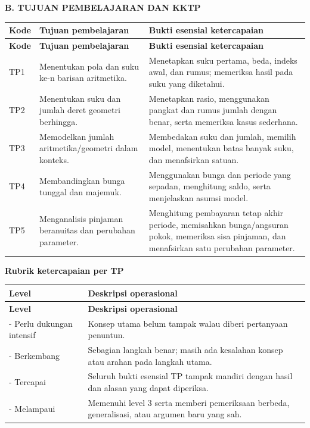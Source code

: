 \documentclass[11pt,a4paper]{article}
\begin{document}
\clearpage
\begin{center}\bfseries\large B. TUJUAN PEMBELAJARAN DAN KKTP\end{center}\medskip
{\small\setlength{\tabcolsep}{2mm}\renewcommand{\arraystretch}{1.35}\begin{longtable}{|>{\raggedright\arraybackslash}p{16.269mm}|>{\raggedright\arraybackslash}p{67.787mm}|>{\raggedright\arraybackslash}p{81.344mm}|}\hline
\rowcolor{gray!10}\textbf{Kode} & \textbf{Tujuan pembelajaran} & \textbf{Bukti esensial ketercapaian}\\ \hline
\endfirsthead
\rowcolor{gray!10}\textbf{Kode} & \textbf{Tujuan pembelajaran} & \textbf{Bukti esensial ketercapaian}\\ \hline
\endhead
TP1 & Menentukan pola dan suku ke-n barisan aritmetika. & Menetapkan suku pertama, beda, indeks awal, dan rumus; memeriksa hasil pada suku yang diketahui.\\ \hline
TP2 & Menentukan suku dan jumlah deret geometri berhingga. & Menetapkan rasio, menggunakan pangkat dan rumus jumlah dengan benar, serta memeriksa kasus sederhana.\\ \hline
TP3 & Memodelkan jumlah aritmetika/geometri dalam konteks. & Membedakan suku dan jumlah, memilih model, menentukan batas banyak suku, dan menafsirkan satuan.\\ \hline
TP4 & Membandingkan bunga tunggal dan majemuk. & Menggunakan bunga dan periode yang sepadan, menghitung saldo, serta menjelaskan asumsi model.\\ \hline
TP5 & Menganalisis pinjaman beranuitas dan perubahan parameter. & Menghitung pembayaran tetap akhir periode, memisahkan bunga/angsuran pokok, memeriksa sisa pinjaman, dan menafsirkan satu perubahan parameter.\\ \hline
\end{longtable}}\medskip
\par\medskip\noindent\textbf{Rubrik ketercapaian per TP}\par\smallskip
{\small\setlength{\tabcolsep}{2mm}\renewcommand{\arraystretch}{1.35}\begin{longtable}{|>{\raggedright\arraybackslash}p{41.693mm}|>{\raggedright\arraybackslash}p{127.857mm}|}\hline
\rowcolor{gray!10}\textbf{Level} & \textbf{Deskripsi operasional}\\ \hline
\endfirsthead
\rowcolor{gray!10}\textbf{Level} & \textbf{Deskripsi operasional}\\ \hline
\endhead
1 - Perlu dukungan intensif & Konsep utama belum tampak walau diberi pertanyaan penuntun.\\ \hline
2 - Berkembang & Sebagian langkah benar; masih ada kesalahan konsep atau arahan pada langkah utama.\\ \hline
3 - Tercapai & Seluruh bukti esensial TP tampak mandiri dengan hasil dan alasan yang dapat diperiksa.\\ \hline
4 - Melampaui & Memenuhi level 3 serta memberi pemeriksaan berbeda, generalisasi, atau argumen baru yang sah.\\ \hline
\end{longtable}}\medskip
\end{document}
